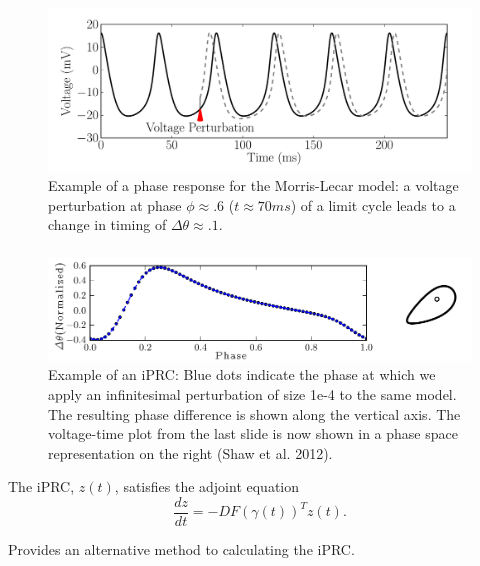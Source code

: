 \documentclass{beamer}
\begin{document}
  \begin{frame}
 \frametitle{\insertsection}
    	\framesubtitle{\insertsubsection}
    \begin{figure}
\includegraphics[width=1\textwidth]{voltage-pert-ml-vt.pdf}
\caption{Example of a phase response for the Morris-Lecar model: a voltage perturbation at phase $\phi \approx .6$ ($t \approx 70ms$) of a limit cycle leads to a change in timing of $\Delta \theta \approx .1$.  }
\end{figure}
  \end{frame}

  \begin{frame}
 \frametitle{\insertsection}
    	\framesubtitle{\insertsubsection}
    \begin{figure}
\includegraphics[width=1\textwidth]{voltage-pert-ml-quarter.png}
\caption{Example of an iPRC: Blue dots indicate the phase at which we apply an infinitesimal perturbation of size 1e-4 to the same model. The resulting phase difference is shown along the vertical axis.  The voltage-time plot from the last slide is now shown in a phase space representation on the right (Shaw et al. 2012).}
\end{figure}
  \end{frame}



\begin{frame}
 The iPRC, $z(t)$, satisfies the adjoint equation
\begin{equation}
 \frac{dz}{dt} = -DF(\gamma(t))^T z(t).
\end{equation}

 Provides an alternative method to calculating the iPRC.

\end{frame}
\end{document}
